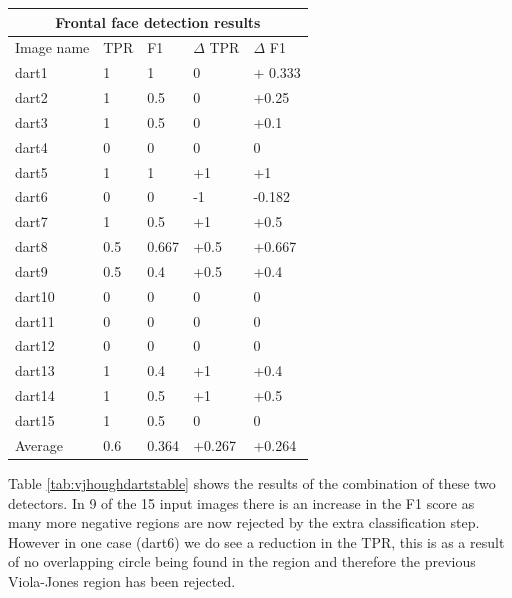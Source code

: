 \documentclass{article}
\begin{document}
\begin{multicols}{2}
\begin{multicols}{2}
\end{multicols}
\label{fig:hough2results}

\begin{center}
\begin{tabular}{ |p{1.3cm}||p{1.3cm}|p{1.3cm}|p{1.3cm}|p{1.3cm}| }
 \hline
 \multicolumn{5}{|c|}{Frontal face detection results} \\
 \hline
 Image name & TPR & F1 & \(\Delta\) TPR & \(\Delta\) F1 \\
 \hline
 dart1  & 1  & 1 & 0 & + 0.333 \\
 dart2  & 1  & 0.5 & 0 & +0.25       \\
 dart3  & 1  & 0.5 & 0 & +0.1       \\
 dart4  & 0  & 0 & 0 & 0         \\
 dart5  & 1  & 1 & +1 & +1         \\
 dart6  & 0  & 0 & -1 & -0.182 \\
 dart7  & 1  & 0.5 & +1 & +0.5         \\
 dart8  & 0.5  & 0.667 & +0.5 & +0.667   \\
 dart9  & 0.5  & 0.4 & +0.5 & +0.4           \\
 dart10 & 0  & 0 & 0 & 0          \\
 dart11 & 0  & 0 & 0 & 0          \\
 dart12 & 0  & 0 & 0 & 0         \\
 dart13 & 1  & 0.4 & +1 & +0.4         \\
 dart14 & 1  & 0.5 & +1 & +0.5         \\
 dart15 & 1  & 0.5 & 0 & 0     \\
 \hline
 Average& 0.6 & 0.364 & +0.267 & +0.264   \\ 
 \hline
\end{tabular}
\label{tab:vjhoughdartstable}
\end{center}

Table \ref{tab:vjhoughdartstable} shows the results of the combination of these
two detectors. In 9 of the 15 input images there is an increase in the F1 score
as many more negative regions are now rejected by the extra classification step. 
However in one case (dart6) we do see a reduction in the TPR, this is as a
result of no overlapping circle being found in the region and therefore the
previous Viola-Jones region has been rejected.


\end{multicols}
\end{document}
